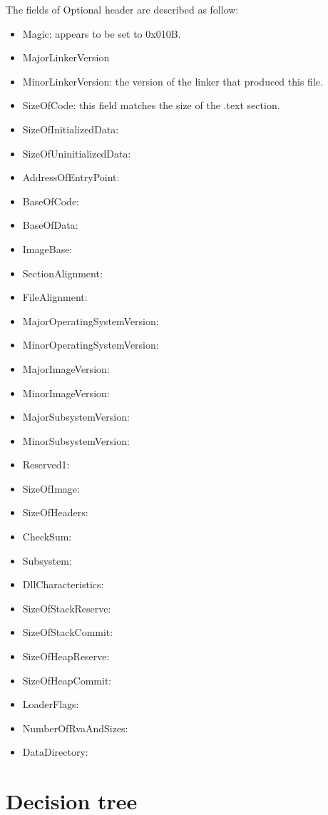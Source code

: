 The fields of Optional header are described as follow: 
\begin{itemize}
\item Magic: appears to be set to 0x010B.
\item MajorLinkerVersion
\item MinorLinkerVersion: the version of the linker that produced this file.
\item SizeOfCode: this field matches the size of the .text section.
\item SizeOfInitializedData: 
\item SizeOfUninitializedData: 
\item AddressOfEntryPoint: 
\item BaseOfCode: 
\item BaseOfData: 
\item ImageBase: 
\item SectionAlignment: 
\item FileAlignment: 
\item MajorOperatingSystemVersion: 
\item MinorOperatingSystemVersion: 
\item MajorImageVersion: 
\item MinorImageVersion: 
\item MajorSubsystemVersion: 
\item MinorSubsystemVersion: 
\item Reserved1: 
\item SizeOfImage: 
\item SizeOfHeaders: 
\item CheckSum: 
\item Subsystem: 
\item DllCharacteristics: 
\item SizeOfStackReserve:
\item SizeOfStackCommit: 
\item SizeOfHeapReserve:
\item SizeOfHeapCommit: 
\item LoaderFlags: 
\item NumberOfRvaAndSizes:
\item DataDirectory:
\end{itemize}

\section{Decision tree\cite{decisiontree}}

